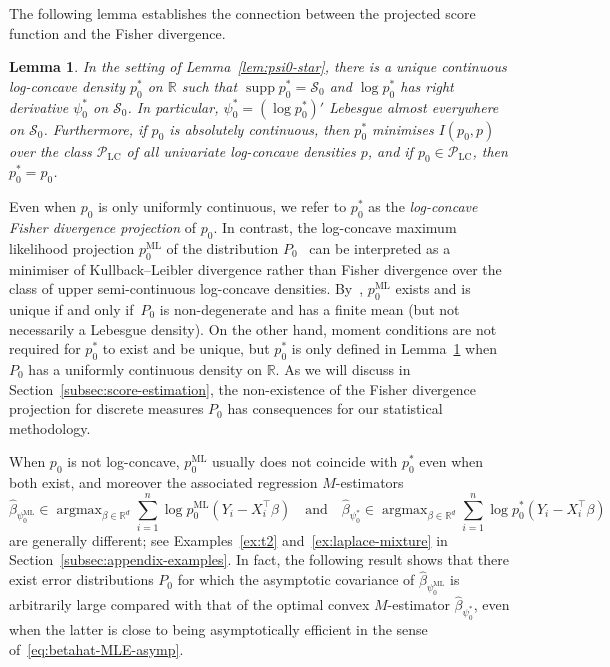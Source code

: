 \documentclass[a4paper]{article}
\newcommand{\R}{\mathbb{R}}
\DeclareMathOperator{\supp}{supp}
\DeclareMathOperator*{\argmax}{argmax}
\newtheorem{lemma}[theorem]{Lemma}
\theoremstyle{definition}
\begin{document}
The following lemma establishes the connection between the projected score function and the Fisher divergence.
\begin{lemma}
\label{lem:p0-star}
In the setting of Lemma~\ref{lem:psi0-star}, there is a unique continuous log-concave density $p_0^*$ on $\R$ such that $\supp p_0^* = \mathcal{S}_0$ and $\log p_0^*$ has right derivative $\psi_0^*$ on $\mathcal{S}_0$. In particular, $\psi_0^* = (\log p_0^*)'$ Lebesgue almost everywhere on $\mathcal{S}_0$.  Furthermore, if $p_0$ is absolutely continuous, then $p_0^*$ minimises $I(p_0,p)$ over the class $\mathcal{P}_{\mathrm{LC}}$ of all univariate log-concave densities $p$, and if $p_0 \in \mathcal{P}_{\mathrm{LC}}$, then $p_0^* = p_0$.
\end{lemma} 
Even when $p_0$ is only uniformly continuous, we refer to $p_0^*$ as the \textit{log-concave Fisher divergence projection} of $p_0$. In contrast, the log-concave maximum likelihood projection $p_0^{\mathrm{ML}}$ of the distribution $P_0$~\citep{dumbgen2011approximation,barber2021local} can be interpreted as a minimiser of Kullback--Leibler divergence rather than Fisher divergence over the class of upper semi-continuous log-concave densities. By~\citet[Theorem~2.2]{dumbgen2011approximation}, $p_0^{\mathrm{ML}}$ exists and is unique if and only if~$P_0$ is non-degenerate and has a finite mean (but not necessarily a Lebesgue density). On the other hand, moment conditions are not required for $p_0^*$ to exist and be unique, but $p_0^*$ is only defined in Lemma~\ref{lem:p0-star} when~$P_0$ has a uniformly continuous density on $\R$. As we will discuss in Section~\ref{subsec:score-estimation}, the non-existence of the Fisher divergence projection for discrete measures $P_0$ has consequences for our statistical methodology. 

When $p_0$ is not log-concave, $p_0^{\mathrm{ML}}$ usually does not coincide with $p_0^*$ even when both exist, and moreover the associated regression $M$-estimators 
\begin{equation}
\label{eq:betahat-ML-fisher}
\hat{\beta}_{\psi_0^{\mathrm{ML}}} \in \argmax_{\beta \in \R^d} \sum_{i=1}^n \log p_0^{\mathrm{ML}}(Y_i - X_i^\top\beta) \quad\text{and}\quad \hat{\beta}_{\psi_0^*} \in \argmax_{\beta \in \R^d} \sum_{i=1}^n \log p_0^*(Y_i - X_i^\top\beta)
\end{equation}
are generally different; see Examples~\ref{ex:t2} and~\ref{ex:laplace-mixture} in Section~\ref{subsec:appendix-examples}. In fact, the following result shows that there exist error distributions $P_0$ for which the asymptotic covariance of $\hat{\beta}_{\psi_0^{\mathrm{ML}}}$ is arbitrarily large compared with that of the optimal convex $M$-estimator $\hat{\beta}_{\psi_0^*}$, even when the latter is close to being asymptotically efficient in the sense of~\eqref{eq:betahat-MLE-asymp}.
\end{document}
